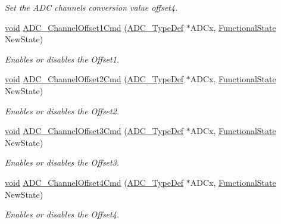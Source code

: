 \begin{DoxyCompactItemize}
\begin{DoxyCompactList}\small\item\em Set the A\-D\-C channels conversion value offset4. \end{DoxyCompactList}\item 
\hyperlink{group___n_a_m_e_ga18028b8badbf1ea7e704ccac3c488e82}{void} \hyperlink{group___a_d_c___exported___constants_ga099ca28e280598501ac43ebbb1dfb27e}{A\-D\-C\-\_\-\-Channel\-Offset1\-Cmd} (\hyperlink{struct_a_d_c___type_def}{A\-D\-C\-\_\-\-Type\-Def} $\ast$A\-D\-Cx, \hyperlink{group___exported__types_gac9a7e9a35d2513ec15c3b537aaa4fba1}{Functional\-State} New\-State)
\begin{DoxyCompactList}\small\item\em Enables or disables the Offset1. \end{DoxyCompactList}\item 
\hyperlink{group___n_a_m_e_ga18028b8badbf1ea7e704ccac3c488e82}{void} \hyperlink{group___a_d_c___exported___constants_gaca526bb6eeb80d041a24faffc6894e91}{A\-D\-C\-\_\-\-Channel\-Offset2\-Cmd} (\hyperlink{struct_a_d_c___type_def}{A\-D\-C\-\_\-\-Type\-Def} $\ast$A\-D\-Cx, \hyperlink{group___exported__types_gac9a7e9a35d2513ec15c3b537aaa4fba1}{Functional\-State} New\-State)
\begin{DoxyCompactList}\small\item\em Enables or disables the Offset2. \end{DoxyCompactList}\item 
\hyperlink{group___n_a_m_e_ga18028b8badbf1ea7e704ccac3c488e82}{void} \hyperlink{group___a_d_c___exported___constants_gabcb4e23ba0d4f11932797debfffafcb6}{A\-D\-C\-\_\-\-Channel\-Offset3\-Cmd} (\hyperlink{struct_a_d_c___type_def}{A\-D\-C\-\_\-\-Type\-Def} $\ast$A\-D\-Cx, \hyperlink{group___exported__types_gac9a7e9a35d2513ec15c3b537aaa4fba1}{Functional\-State} New\-State)
\begin{DoxyCompactList}\small\item\em Enables or disables the Offset3. \end{DoxyCompactList}\item 
\hyperlink{group___n_a_m_e_ga18028b8badbf1ea7e704ccac3c488e82}{void} \hyperlink{group___a_d_c___exported___constants_gac74f1f331da6e7ec619c84b2332c5cc1}{A\-D\-C\-\_\-\-Channel\-Offset4\-Cmd} (\hyperlink{struct_a_d_c___type_def}{A\-D\-C\-\_\-\-Type\-Def} $\ast$A\-D\-Cx, \hyperlink{group___exported__types_gac9a7e9a35d2513ec15c3b537aaa4fba1}{Functional\-State} New\-State)
\begin{DoxyCompactList}\small\item\em Enables or disables the Offset4. \end{DoxyCompactList}\item 

\end{DoxyCompactItemize}
